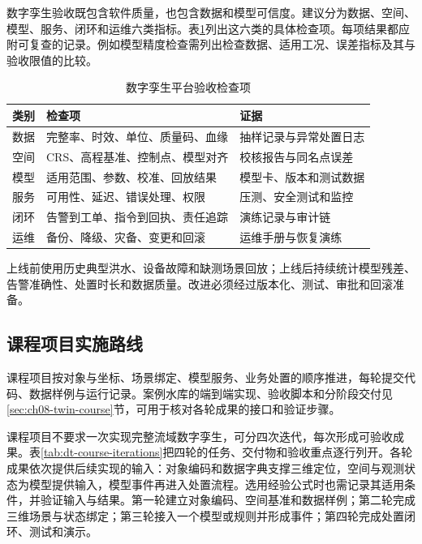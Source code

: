 数字孪生验收既包含软件质量，也包含数据和模型可信度。建议分为数据、空间、模型、服务、闭环和运维六类指标。表\ref{tab:dt-acceptance}列出这六类的具体检查项。每项结果都应附可复查的记录。例如模型精度检查需列出检查数据、适用工况、误差指标及其与验收限值的比较。

\begin{table}[htbp]
\centering
\caption{数字孪生平台验收检查项}
\label{tab:dt-acceptance}
\begin{tabular}{p{2.3cm}p{5.0cm}p{5.4cm}}
\toprule
类别 & 检查项 & 证据 \\
\midrule
数据 & 完整率、时效、单位、质量码、血缘 & 抽样记录与异常处置日志 \\
空间 & CRS、高程基准、控制点、模型对齐 & 校核报告与同名点误差 \\
模型 & 适用范围、参数、校准、回放结果 & 模型卡、版本和测试数据 \\
服务 & 可用性、延迟、错误处理、权限 & 压测、安全测试和监控 \\
闭环 & 告警到工单、指令到回执、责任追踪 & 演练记录与审计链 \\
运维 & 备份、降级、灾备、变更和回滚 & 运维手册与恢复演练 \\
\bottomrule
\end{tabular}
\end{table}

上线前使用历史典型洪水、设备故障和缺测场景回放；上线后持续统计模型残差、告警准确性、处置时长和数据质量。改进必须经过版本化、测试、审批和回滚准备。

\subsection{课程项目实施路线}\label{online:twin-course}

课程项目按对象与坐标、场景绑定、模型服务、业务处置的顺序推进，每轮提交代码、数据样例与运行记录。案例水库的端到端实现、验收脚本和分阶段交付见\ref{sec:ch08-twin-course}节，可用于核对各轮成果的接口和验证步骤。

课程项目不要求一次实现完整流域数字孪生，可分四次迭代，每次形成可验收成果。表\ref{tab:dt-course-iterations}把四轮的任务、交付物和验收重点逐行列开。各轮成果依次提供后续实现的输入：对象编码和数据字典支撑三维定位，空间与观测状态为模型提供输入，模型事件再进入处置流程。选用经验公式时也需记录其适用条件，并验证输入与结果。第一轮建立对象编码、空间基准和数据样例；第二轮完成三维场景与状态绑定；第三轮接入一个模型或规则并形成事件；第四轮完成处置闭环、测试和演示。

